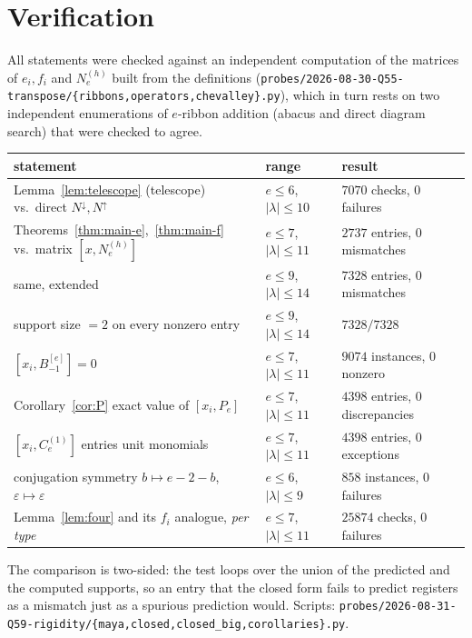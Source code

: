 \documentclass[11pt]{article}
\theoremstyle{plain}
\theoremstyle{definition}
\newcommand{\Nb}{N^{\downarrow}}
\newcommand{\Na}{N^{\uparrow}}
\begin{document}
\section{Verification}

All statements were checked against an independent computation of the matrices of
$e_i,f_i$ and $N_e^{(h)}$ built from the definitions
(\texttt{probes/2026-08-30-Q55-transpose/\{ribbons,operators,chevalley\}.py}), which
in turn rests on two independent enumerations of $e$-ribbon addition (abacus and
direct diagram search) that were checked to agree.

\begin{center}
\begin{tabular}{lll}
\hline
statement & range & result\\
\hline
Lemma~\ref{lem:telescope} (telescope) vs.\ direct $\Nb,\Na$
 & $e\le6$, $|\lambda|\le10$ & $7070$ checks, $0$ failures\\
Theorems~\ref{thm:main-e},~\ref{thm:main-f} vs.\ matrix $[x,N^{(h)}_e]$
 & $e\le7$, $|\lambda|\le11$ & $2737$ entries, $0$ mismatches\\
\quad same, extended
 & $e\le9$, $|\lambda|\le14$ & $7328$ entries, $0$ mismatches\\
support size $=2$ on every nonzero entry
 & $e\le9$, $|\lambda|\le14$ & $7328/7328$\\
$[x_i,B^{[e]}_{-1}]=0$
 & $e\le7$, $|\lambda|\le11$ & $9074$ instances, $0$ nonzero\\
Corollary~\ref{cor:P} exact value of $[x_i,P_e]$
 & $e\le7$, $|\lambda|\le11$ & $4398$ entries, $0$ discrepancies\\
$[x_i,C^{(1)}_e]$ entries unit monomials
 & $e\le7$, $|\lambda|\le11$ & $4398$ entries, $0$ exceptions\\
conjugation symmetry $b\mapsto e-2-b$, $\varepsilon\mapsto\varepsilon$
 & $e\le6$, $|\lambda|\le9$ & $858$ instances, $0$ failures\\
Lemma~\ref{lem:four} and its $f_i$ analogue, \emph{per type}
 & $e\le7$, $|\lambda|\le11$ & $25874$ checks, $0$ failures\\
\hline
\end{tabular}
\end{center}

The comparison is two-sided: the test loops over the union of the predicted and the
computed supports, so an entry that the closed form fails to predict registers as a
mismatch just as a spurious prediction would. Scripts:
\texttt{probes/2026-08-31-Q59-rigidity/\{maya,closed,closed\_big,corollaries\}.py}.
\end{document}
